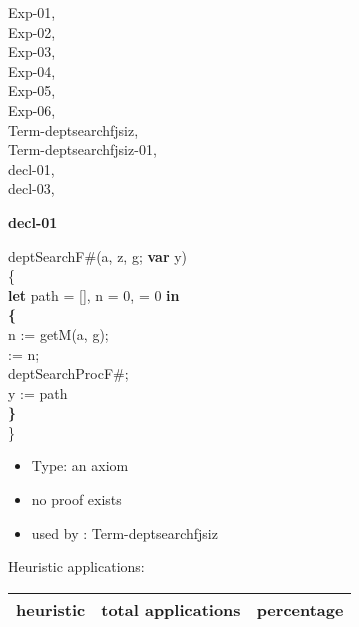 \documentclass[a4paper]{article}
\begin{document}
\raggedright
              


{\parindent0cm

\begin{multicols}{3}
Exp-01, \pageref{lemma-Exp-01}\\
Exp-02, \pageref{lemma-Exp-02}\\
Exp-03, \pageref{lemma-Exp-03}\\
Exp-04, \pageref{lemma-Exp-04}\\
Exp-05, \pageref{lemma-Exp-05}\\
Exp-06, \pageref{lemma-Exp-06}\\
Term-deptsearchfjsiz, \pageref{lemma-Term-deptsearchfjsiz}\\
Term-deptsearchfjsiz-01, \pageref{lemma-Term-deptsearchfjsiz-01}\\
decl-01, \pageref{lemma-decl-01}\\
decl-03, \pageref{lemma-decl-03}\\

\end{multicols}}

\pagebreak

{\LARGE\bf decl-01}\label{lemma-decl-01}

\medskip

deptSearchF\#(a, z, g; {\bf var} y) \\
\{\\
{\bf let} path = [], n = 0,  = 0 {\bf in}\\
{\bf \{}\\
\tabbe n := getM(a, g);\\
\tabbe {} := n;\\
\tabbe deptSearchProcF\#;\\
\tabbe y := path\\
{\bf \}}\\
\}

\begin{itemize}

\item Type: an axiom

\item       no proof exists
\item       used by      : Term-deptsearchfjsiz
\end{itemize}

\medskip


Heuristic applications:

\begin{supertabular}{l|r|r}
heuristic	& total applications & percentage \\ \hline

\end{supertabular}
\end{document}
